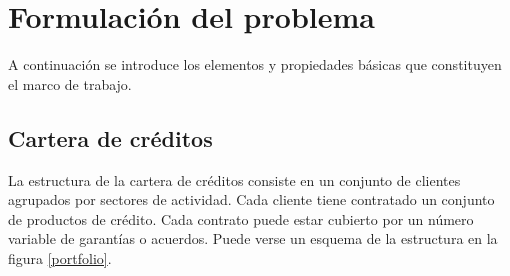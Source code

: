 
%
%
%
%
%
%
%
%

\chapter{Formulaci\'on del problema}
\label{sec:formulation}

\begin{center}
\end{center}

A continuaci\'on se introduce los elementos y propiedades b\'asicas que 
constituyen el marco de trabajo.


\section{Cartera de cr\'editos}

La estructura de la cartera de cr\'editos consiste en un conjunto de
clientes agrupados por sectores de actividad. Cada cliente tiene contratado 
un conjunto de productos de cr\'edito. Cada contrato puede estar 
cubierto por un n\'umero variable de garant\'ias o acuerdos.
Puede verse un esquema de la estructura en la figura \ref{portfolio}.

